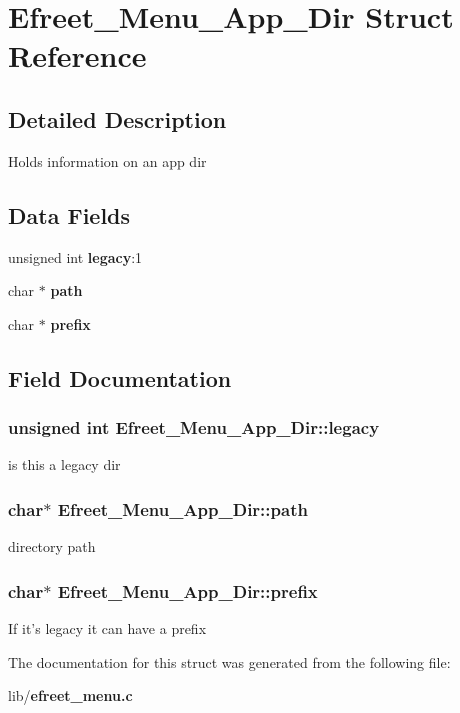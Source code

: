 \section{Efreet\_\-Menu\_\-App\_\-Dir Struct Reference}
\label{structEfreet__Menu__App__Dir}


\subsection{Detailed Description}
Holds information on an app dir \subsection*{Data Fields}
\begin{CompactItemize}
\item 
unsigned int {\bf legacy}:1
\item 
char $\ast$ {\bf path}
\item 
char $\ast$ {\bf prefix}
\end{CompactItemize}


\subsection{Field Documentation}
\subsubsection{\setlength{\rightskip}{0pt plus 5cm}unsigned int {\bf Efreet\_\-Menu\_\-App\_\-Dir::legacy}}\label{structEfreet__Menu__App__Dir_23534a6082c5ef83d55fa0e3a95da6cd}


is this a legacy dir 
\subsubsection{\setlength{\rightskip}{0pt plus 5cm}char$\ast$ {\bf Efreet\_\-Menu\_\-App\_\-Dir::path}}\label{structEfreet__Menu__App__Dir_6f8402c8df46598efddbf2d5bc1ffc4f}


directory path 
\subsubsection{\setlength{\rightskip}{0pt plus 5cm}char$\ast$ {\bf Efreet\_\-Menu\_\-App\_\-Dir::prefix}}\label{structEfreet__Menu__App__Dir_5f3c6f6ba91f59537f2bdcd92c0cae0e}


If it's legacy it can have a prefix 

The documentation for this struct was generated from the following file:\begin{CompactItemize}
\item 
lib/{\bf efreet\_\-menu.c}\end{CompactItemize}
